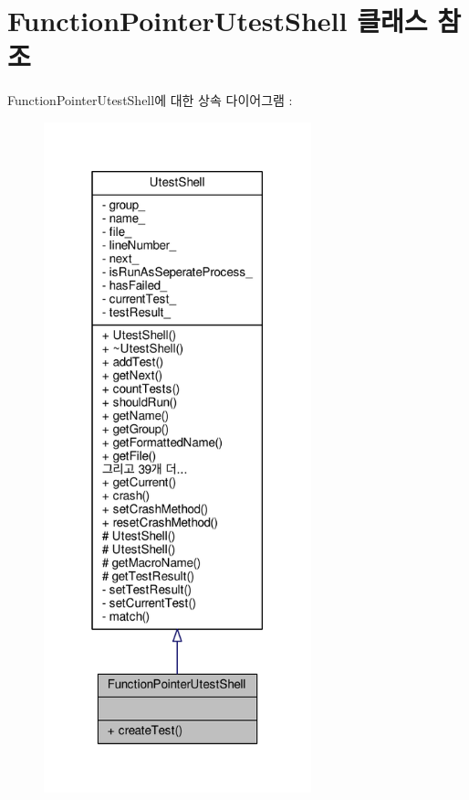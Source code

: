 \hypertarget{class_function_pointer_utest_shell}{}\section{Function\+Pointer\+Utest\+Shell 클래스 참조}
\label{class_function_pointer_utest_shell}


Function\+Pointer\+Utest\+Shell에 대한 상속 다이어그램 \+: 
\nopagebreak
\begin{figure}[H]
\begin{center}
\leavevmode
\includegraphics[height=550pt]{class_function_pointer_utest_shell__inherit__graph}
\end{center}
\end{figure}


